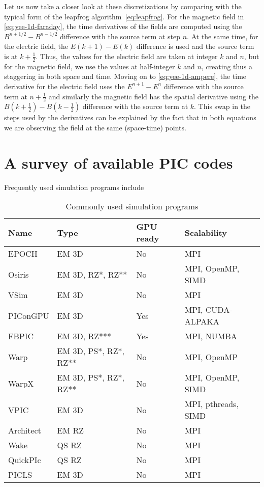 \documentclass[12pt, class=report, crop=false]{standalone}
\begin{document}
Let us now take a closer look at these discretizations by comparing with the typical form of the leapfrog
algorithm~\eqref{eq:leapfrog}.
For the magnetic field in \cref{eq:yee-1d-faraday}, the time derivatives of the fields are
computed using the \(B^{n+1/2} - B^{n-1/2}\) difference with the source term at step \(n\). At the same time, for the electric field, the \(E(k+1)-E(k)\) difference is used and the source
term is at \(k+\frac{1}{2}\). Thus, the values for the electric
field are taken at integer \(k\) and \(n\), but for the magnetic
field, we use the values at half-integer \(k\) and \(n\), creating
thus a staggering in both space and time. Moving on to  \cref{eq:yee-1d-ampere},
the time derivative for the electric field uses the \(E^{n+1}-E^n\)
difference with the source term at \(n+\frac{1}{2}\) and similarly
the magnetic field has the spatial derivative using the \(B(k+\frac{1}{2}) - B(k-\frac{1}{2})\) difference with the source
term at \(k\). This swap in the steps used by the derivatives can
be explained by the fact that in both equations we are observing
the field at the same (space-time) points.

\section{A survey of available PIC codes}

Frequently used simulation programs include

\begin{table}
  \begin{tabular}{l l l l}
  \toprule
  \textbf{Name} & \textbf{Type} & \textbf{GPU ready} & \textbf{Scalability}\\
  \midrule
  EPOCH & EM 3D & No & MPI\\
  Osiris & EM 3D, RZ*, RZ** & No & MPI, OpenMP, SIMD\\
  VSim & EM 3D & No & MPI\\
  PIConGPU & EM 3D & Yes & MPI, CUDA-ALPAKA\\
  FBPIC & EM 3D, RZ*** & Yes & MPI, NUMBA\\
  Warp & EM 3D, PS*, RZ*, RZ** & No & MPI, OpenMP\\
  WarpX & EM 3D, PS*, RZ*, RZ** & No & MPI, OpenMP, SIMD\\
  VPIC & EM 3D & No & MPI, pthreads, SIMD\\
  Architect & EM RZ & No & MPI\\
  Wake & QS RZ & No & MPI\\
  QuickPIc & QS RZ & No & MPI\\
  PICLS & EM 3D & No & MPI\\
  \bottomrule
  \end{tabular}
  \caption{Commonly used simulation programs}%
  \label{tab:pic-software}
\end{table}
\end{document}
